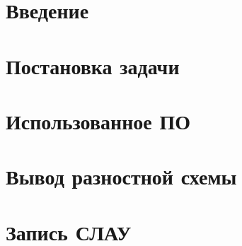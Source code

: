\documentclass[a4paper, 12pt]{article}
\begin{document}
  \renewcommand*{\vec}[1]{\mathbf{#1}}
  \newcommand{\Int}[2]{\int\limits_{#1}^{#2}}
  \newcommand{\Inner}[1]{\! #1 \,}
  \newcommand{\Dd}[1]{\dd #1}
  \newcommand{\Ddd}[2]{\dd #1 \dd #2}
  \newcommand{\MyVert}[1]{\Big\vert_{#1}}
  \newcommand{\MyVvert}[2]{\Big\vert_{\begin{subarray}{l} #1 \\ #2 \end{subarray}}}

  \newcommand{\Ttitle}[1]{\noindent\textbf{#1}}

  

  
  \setcounter{page}{2}
  \tableofcontents

  \newpage
  \section*{Введение}\label{introduction}
  

  \newpage
  \section{Постановка задачи}
  

  \newpage
  \section{Использованное ПО}
  

  \newpage
  \section{Вывод разностной схемы}
  


  \newpage
  \section{Запись СЛАУ}
  

\end{document}
